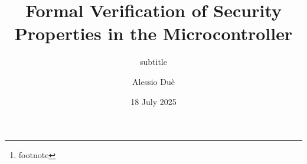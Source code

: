 



\listfiles





\titlehead{
  {\Large Università di Pisa \hfill A.Y.~2024--2025} \\
  {\large Dipartimento di Informatica}
}
\subject{Master's Thesis in Computer Science}
\title{Formal Verification of Security Properties in the \msp Microcontroller}
\subtitle{subtitle }
\author{Alessio Duè}
\date{18 July 2025}
\publishers{relatori...\thanks{footnote}}


\maketitle %
\tableofcontents

\mainmatter







\backmatter
\printbibliography[heading=bibintoc]



